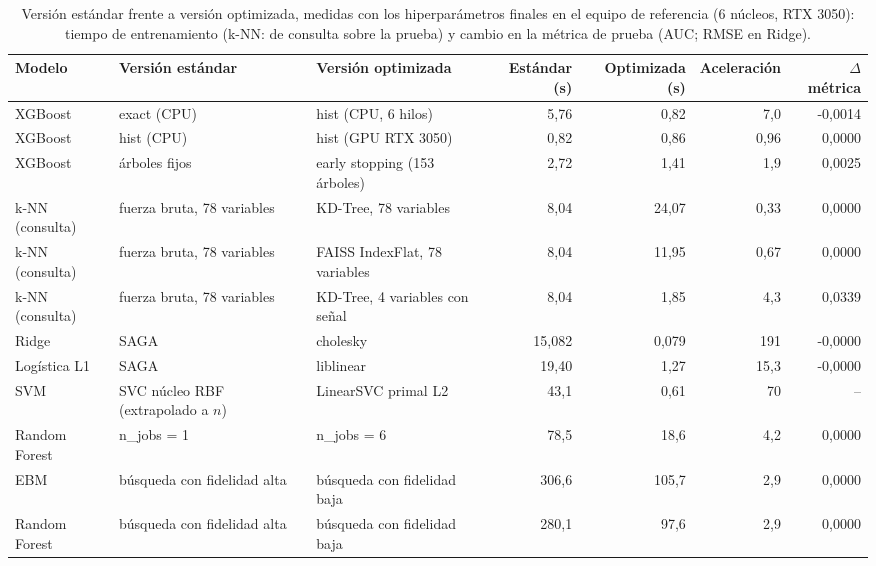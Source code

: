 \begin{table}
\caption{Versión estándar frente a versión optimizada, medidas con los hiperparámetros finales en el equipo de referencia (6 núcleos, RTX 3050): tiempo de entrenamiento (k-NN: de consulta sobre la prueba) y cambio en la métrica de prueba (AUC; RMSE en Ridge).}\label{tab:computo}
\scriptsize\setlength{\tabcolsep}{2.8pt}
\begin{tabular}{l>{\raggedright\arraybackslash}p{3.2cm}>{\raggedright\arraybackslash}p{3.6cm}rrrr}
\toprule
\textbf{Modelo} & \textbf{Versión estándar} & \textbf{Versión optimizada} & \textbf{Estándar (s)} & \textbf{Optimizada (s)} & \textbf{Aceleración} & \textbf{$\Delta$ métrica} \\
\midrule
XGBoost & exact (CPU) & hist (CPU, 6 hilos) & 5,76 & 0,82 & 7,0 & -0,0014 \\
XGBoost & hist (CPU) & hist (GPU RTX 3050) & 0,82 & 0,86 & 0,96 & 0,0000 \\
XGBoost & 500 árboles fijos & early stopping (153 árboles) & 2,72 & 1,41 & 1,9 & 0,0025 \\
k-NN (consulta) & fuerza bruta, 78 variables & KD-Tree, 78 variables & 8,04 & 24,07 & 0,33 & 0,0000 \\
k-NN (consulta) & fuerza bruta, 78 variables & FAISS IndexFlat, 78 variables & 8,04 & 11,95 & 0,67 & 0,0000 \\
k-NN (consulta) & fuerza bruta, 78 variables & KD-Tree, 4 variables con señal & 8,04 & 1,85 & 4,3 & 0,0339 \\
Ridge & SAGA & cholesky & 15,082 & 0,079 & 191 & -0,0000 \\
Logística L1 & SAGA & liblinear & 19,40 & 1,27 & 15,3 & -0,0000 \\
SVM & SVC núcleo RBF (extrapolado a $n$) & LinearSVC primal L2 & 43,1 & 0,61 & 70 & -- \\
Random Forest & n\_jobs = 1 & n\_jobs = 6 & 78,5 & 18,6 & 4,2 & 0,0000 \\
EBM & búsqueda con fidelidad alta & búsqueda con fidelidad baja & 306,6 & 105,7 & 2,9 & 0,0000 \\
Random Forest & búsqueda con fidelidad alta & búsqueda con fidelidad baja & 280,1 & 97,6 & 2,9 & 0,0000 \\
\bottomrule
\end{tabular}
\end{table}
